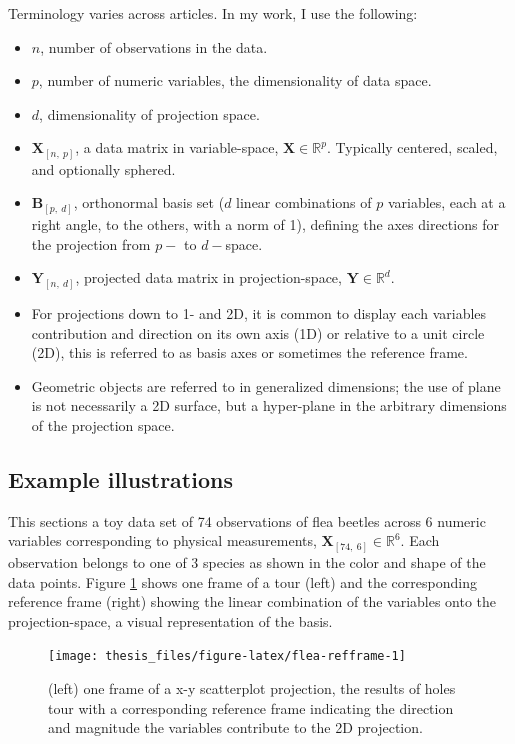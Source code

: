 \documentclass{monashthesis}
\begin{document}
Terminology varies across articles. In my work, I use the following:

\begin{itemize}
\tightlist
\item
  \(n\), number of observations in the data.
\item
  \(p\), number of numeric variables, the dimensionality of data space.
\item
  \(d\), dimensionality of projection space.
\item
  \(\textbf{X}_{[n,~p]}\), a data matrix in variable-space,
  \(\textbf{X} \in \mathbb{R}^{p}\). Typically centered, scaled, and
  optionally sphered.
\item
  \(\textbf{B}_{[p,~d]}\), orthonormal basis set (\(d\) linear
  combinations of \(p\) variables, each at a right angle, to the others,
  with a norm of 1), defining the axes directions for the projection
  from \(p-\) to \(d-\)space.
\item
  \(\textbf{Y}_{[n,~d]}\), projected data matrix in projection-space,
  \(\textbf{Y} \in \mathbb{R}^{d}\).
\item
  For projections down to 1- and 2D, it is common to display each
  variables contribution and direction on its own axis (1D) or relative
  to a unit circle (2D), this is referred to as basis axes or sometimes
  the reference frame.
\item
  Geometric objects are referred to in generalized dimensions; the use
  of plane is not necessarily a 2D surface, but a hyper-plane in the
  arbitrary dimensions of the projection space.
\end{itemize}

\subsection{Example illustrations}\label{example-illustrations}

This sections a toy data set of 74 observations of flea beetles across 6
numeric variables corresponding to physical measurements,
\(\textbf{X}_{[74,~6]} \in \mathbb{R}^{6}\). Each observation belongs to
one of 3 species as shown in the color and shape of the data points.
Figure \ref{fig:flea-refframe} shows one frame of a tour (left) and the
corresponding reference frame (right) showing the linear combination of
the variables onto the projection-space, a visual representation of the
basis.

\begin{figure}

{\centering \texttt{[image: thesis\_files/figure-latex/flea-refframe-1]} 

}

\caption{(left) one frame of a x-y scatterplot projection, the results of holes tour with a corresponding reference frame indicating the direction and magnitude the variables contribute to the 2D projection.}\label{fig:flea-refframe}
\end{figure}
\end{document}

